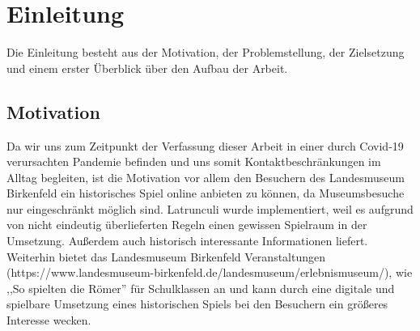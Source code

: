 
\chapter{Einleitung}
\label{ch:Latrunculi}


Die Einleitung besteht aus der Motivation, der Problemstellung, der Zielsetzung und einem erster Überblick über den Aufbau der Arbeit.

\section{Motivation}
\label{ch:Einleitung:sec:Motivation}
Da wir uns zum Zeitpunkt der Verfassung dieser Arbeit in einer durch Covid-19 verursachten Pandemie befinden und uns somit Kontaktbeschränkungen im Alltag begleiten, ist die Motivation vor allem den Besuchern des Landesmuseum Birkenfeld ein historisches Spiel online anbieten zu können, da Museumsbesuche nur eingeschränkt möglich sind. Latrunculi wurde implementiert, weil es aufgrund von nicht eindeutig überlieferten Regeln einen gewissen Spielraum in der Umsetzung. Außerdem auch historisch interessante Informationen liefert. Weiterhin bietet das Landesmuseum Birkenfeld Veranstaltungen (https://www.landesmuseum-birkenfeld.de/landesmuseum/erlebnismuseum/), wie ,,So spielten die Römer'' für Schulklassen an und kann durch eine digitale und spielbare Umsetzung  eines historischen Spiels bei den Besuchern ein größeres Interesse wecken.





